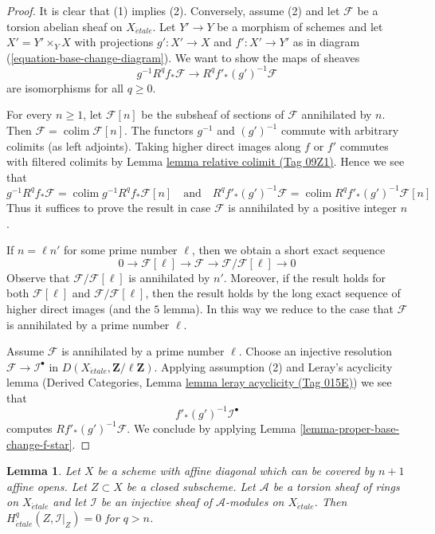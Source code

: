 \documentclass{amsart}
\theoremstyle{plain}
\newtheorem{lemma}[subsection]{Lemma}
\theoremstyle{definition}
\theoremstyle{remark}
\numberwithin{equation}{subsection}
\def\colim{\mathop{\mathrm{colim}}\nolimits}
\def\etale{{\acute{e}tale}}
\begin{document}
\begin{proof}
It is clear that (1) implies (2). Conversely, assume (2) and let
$\mathcal{F}$ be a torsion abelian sheaf on $X_\etale$. Let $Y' \to Y$
be a morphism of schemes and let $X' = Y' \times_Y X$
with projections $g' : X' \to X$ and $f' : X' \to Y'$ as in
diagram (\ref{equation-base-change-diagram}).
We want to show the maps of sheaves
$$
g^{-1}R^qf_*\mathcal{F} \longrightarrow R^qf'_*(g')^{-1}\mathcal{F}
$$
are isomorphisms for all $q \geq 0$.

\medskip\noindent
For every $n \geq 1$, let $\mathcal{F}[n]$ be the subsheaf of sections
of $\mathcal{F}$ annihilated by $n$. Then
$\mathcal{F} = \colim \mathcal{F}[n]$.
The functors $g^{-1}$ and $(g')^{-1}$ commute with arbitrary colimits
(as left adjoints). Taking higher direct images along $f$ or $f'$
commutes with filtered colimits by Lemma \href{https://stacks.math.columbia.edu/tag/09Z1}{lemma relative colimit (Tag 09Z1)}.
Hence we see that
$$
g^{-1}R^qf_*\mathcal{F} = \colim g^{-1}R^qf_*\mathcal{F}[n]
\quad\text{and}\quad
R^qf'_*(g')^{-1}\mathcal{F} =
\colim R^qf'_*(g')^{-1}\mathcal{F}[n]
$$
Thus it suffices to prove the result in case $\mathcal{F}$ is
annihilated by a positive integer $n$.

\medskip\noindent
If $n = \ell n'$ for some prime number $\ell$, then we obtain a short
exact sequence
$$
0 \to \mathcal{F}[\ell] \to \mathcal{F} \to
\mathcal{F}/\mathcal{F}[\ell] \to 0
$$
Observe that $\mathcal{F}/\mathcal{F}[\ell]$ is annihilated by $n'$.
Moreover, if the result holds for both $\mathcal{F}[\ell]$ and
$\mathcal{F}/\mathcal{F}[\ell]$, then the result holds by
the long exact sequence of higher direct images (and the $5$ lemma).
In this way we reduce to the case that $\mathcal{F}$ is annihilated
by a prime number $\ell$.

\medskip\noindent
Assume $\mathcal{F}$ is annihilated by a prime number $\ell$.
Choose an injective resolution $\mathcal{F} \to \mathcal{I}^\bullet$
in $D(X_\etale, \mathbf{Z}/\ell\mathbf{Z})$. Applying assumption
(2) and Leray's acyclicity lemma
(Derived Categories, Lemma \href{https://stacks.math.columbia.edu/tag/015E}{lemma leray acyclicity (Tag 015E)})
we see that
$$
f'_*(g')^{-1}\mathcal{I}^\bullet
$$
computes $Rf'_*(g')^{-1}\mathcal{F}$. We conclude by applying
Lemma \ref{lemma-proper-base-change-f-star}.
\end{proof}


\begin{lemma}
\label{lemma-vanishing-restriction-injective}
Let $X$ be a scheme with affine diagonal which can be covered by
$n + 1$ affine opens. Let $Z \subset X$ be a closed subscheme.
Let $\mathcal{A}$ be a torsion sheaf of rings on $X_\etale$
and let $\mathcal{I}$ be an injective sheaf of $\mathcal{A}$-modules
on $X_\etale$.
Then $H^q_\etale(Z, \mathcal{I}|_Z) = 0$ for $q > n$.
\end{lemma}
\end{document}
